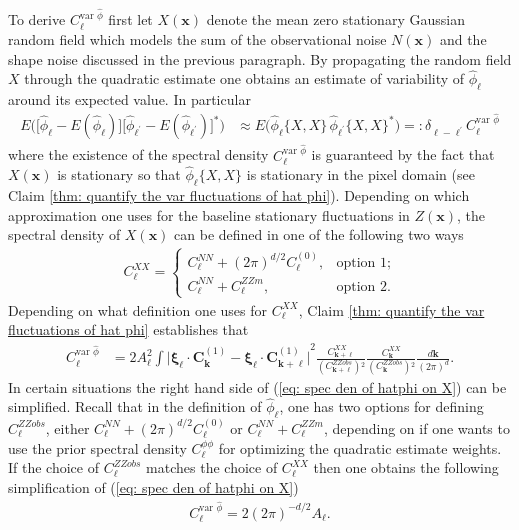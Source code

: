 \documentclass[10pt,noinfoline]{imsart}
\newcommand{\bs}{\boldsymbol}
\begin{document}
To derive $C_{\bs \ell}^{\text{var }\hat\phi}$ first let $X(\bs x)$ denote the mean zero stationary Gaussian random field which models the sum of the observational noise $N(\bs x)$ and the shape noise discussed in the previous paragraph. By propagating the random field $X$ through the quadratic estimate one obtains an estimate of variability of $\hat\phi_{\bs \ell}$ around its expected value. In particular
\begin{align}
E\big(\big[\hat\phi_{\bs \ell}-E(\hat\phi_{\bs \ell})\big]\big[\hat\phi_{\bs \ell^\prime}-E(\hat\phi_{\bs \ell^\prime})\big]^*\big) &\approx E\big(\hat\phi_{\bs \ell}\{X,\!X\} \, \hat\phi_{\bs \ell^\prime}\{X,\!X\}^*\big) =:  \delta^{\phantom{*}}_{\bs \ell-\bs \ell^\prime} C^{\text{var }\hat\phi}_{\bs \ell} \label{var aprox wick form}
\end{align}
where the existence of the spectral density $C^{\text{var }\hat\phi}_{\bs \ell}$ is guaranteed by the fact that $X(\bs x)$ is stationary so that $\hat\phi_{\bs \ell}\{X,X\}$ is stationary in the pixel domain (see Claim \ref{thm: quantify the var fluctuations of hat phi}).
Depending on which approximation one uses for the baseline stationary fluctuations in $Z(\bs x)$, the spectral density of $X(\bs x)$ can be defined in one of the following two ways
\begin{align}\label{Cxx def}
C^{X\!X}_{\bs \ell}=
\begin{cases}
C^{N\!N}_{\bs \ell} + {(2\pi)}^{d/2}C^{(0)}_{\bs \ell}, & \text{option 1;}\\
C^{N\!N}_{\bs \ell} + C^{ZZm}_{\bs \ell}, & \text{option 2.}
\end{cases}
\end{align}
Depending on what definition one uses for $C^{X\!X}_{\bs \ell}$, Claim \ref{thm: quantify the var fluctuations of hat phi} establishes that
\begin{align}
	\label{eq: spec den of hatphi on X}
	C^{\text{var }\hat\phi}_{\bs \ell} &=
        2 A_{\bs\ell}^2
        \int
        {\Big|\bs\xi_{\bs \ell} \!\cdot\!\bs C^{{(1)}}_{\bs k} - \bs\xi_{\bs \ell} \!\cdot\!\bs C^{{(1)}}_{\bs k+\bs \ell}\Big|}^{2}
        \frac{C^{X\!X}_{\bs k+\bs \ell}}{{(C^{ZZobs}_{\bs k+\bs \ell})}{}^2}
        \frac{C^{X\!X}_{\bs k}}{{(C^{ZZobs}_{\bs k})}{}^2}\frac{d\bs k}{{(2\pi)}^{d}}.
    \end{align}
 In certain situations the right hand side of (\ref{eq: spec den of hatphi on X}) can be simplified. Recall that in the definition of $\hat\phi_{\bs \ell}$, one has two options for defining $C^{ZZobs}_{\bs \ell}$, either $C^{N\!N}_{\bs \ell} + {(2\pi)}^{d/2}C^{(0)}_{\bs \ell}$ or $C^{N\!N}_{\bs \ell} + C^{ZZm}_{\bs \ell}$, depending on if one wants to use the prior spectral density $C^{\phi\phi}_{\bs \ell}$ for optimizing the quadratic estimate weights. If the choice of $C^{ZZobs}_{\bs \ell}$ matches the choice of  $C_{\bs \ell}^{X\!X}$ then one obtains the following simplification of (\ref{eq: spec den of hatphi on X})
\begin{align}
	\label{eq: spec den of hatphi on CZZmobs}
C^{\text{var }\hat\phi}_{\bs \ell} = 2{(2\pi)}^{-d/2} A_{\bs \ell}.
 \end{align}
\end{document}
